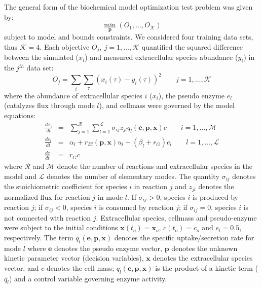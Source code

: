 \documentclass{bmcart}
\begin{document}
The general form of the biochemical model optimization test problem was given by:
\begin{equation}
  \min_{\mathbf{p}}\left(O_{1},\hdots,O_{\mathcal{K}}\right)
\end{equation}subject to model and bounds constraints. We considered four training data sets, thus $\mathcal{K}=4$.
Each objective $O_{j},~j=1,\hdots,\mathcal{K}$ quantified the squared difference between the simulated ($x_{i}$) and measured extracellular species abundance ($y_{i}$)
in the $j^{th}$ data set:
\begin{equation}
  O_{j} = \sum_{i}\sum_{\tau}\left(x_{i}(\tau)-y_{i}(\tau)\right)^2\qquad j=1,\hdots,\mathcal{K}
\end{equation}where the abundance of extracellular species $i$ ($x_{i}$), the pseudo enzyme $e_{l}$ (catalyzes flux through mode $l$), and cellmass were governed by the model equations:
\begin{eqnarray}\nonumber
	\frac{dx_{i}}{dt}  & = &  \sum_{j = 1}^{\mathcal{R}}\sum_{l = 1}^{\mathcal{L}}\sigma_{ij}z_{jl}q_{l}\left(\mathbf{e},\mathbf{p},\mathbf{x}\right)c \qquad{i=1,\hdots,\mathcal{M}}\\\nonumber
  \frac{de_{l}}{dt}  & = & \alpha_{l} + r_{El}\left(\mathbf{p},\mathbf{x}\right)u_{l} - \left(\beta_{l}+r_{G}\right)e_{l} \qquad l=1,\hdots,\mathcal{L} \\\nonumber
  \frac{dc}{dt} & = & r_{G}c
\end{eqnarray}
where $\mathcal{R}$ and $\mathcal{M}$ denote the number of reactions and extracellular species in the model and $\mathcal{L}$ denotes the number of elementary modes.
The quantity $\sigma_{ij}$ denotes the stoichiometric coefficient for species $i$ in reaction $j$ and $z_{jl}$ denotes the normalized flux for reaction $j$ in mode $l$.
If $\sigma_{ij}>0$, species $i$ is produced by reaction $j$;
if $\sigma_{ij}<0$, species $i$ is consumed by reaction $j$; if $\sigma_{ij} = 0$, species $i$ is not connected with reaction $j$.
Extracellular species, cellmass and pseudo-enzyme were subject to the initial conditions $\mathbf{x}\left(t_{o}\right) = \mathbf{x}_{o}$, $c(t_{o})=c_{o}$ and $e_{l}=0.5$, respectively.
The term $q_{l}\left(\mathbf{e},\mathbf{p},\mathbf{x}\right)$ denotes the specific uptake/secretion rate for mode $l$
where $\mathbf{e}$ denotes the pseudo enzyme vector, $\mathbf{p}$ denotes the unknown kinetic parameter vector (decision variables),
$\mathbf{x}$ denotes the extracellular species vector, and $c$ denotes the cell mass;
$q_{l}\left(\mathbf{e},\mathbf{p},\mathbf{x}\right)$ is the product of a kinetic term ($\bar{q}_{l}$) and a control variable governing enzyme activity.
\end{document}
